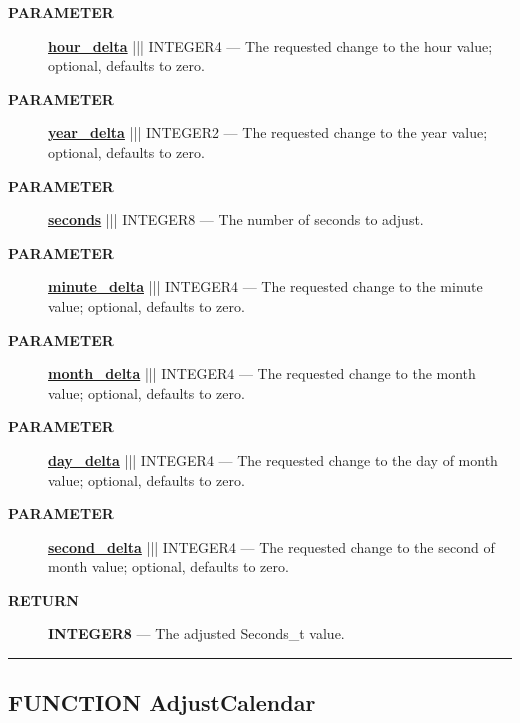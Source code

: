 \par
\begin{description}
\item [\colorbox{tagtype}{\color{white} \textbf{\textsf{PARAMETER}}}] \textbf{\underline{hour\_delta}} ||| INTEGER4 --- The requested change to the hour value; optional, defaults to zero.
\item [\colorbox{tagtype}{\color{white} \textbf{\textsf{PARAMETER}}}] \textbf{\underline{year\_delta}} ||| INTEGER2 --- The requested change to the year value; optional, defaults to zero.
\item [\colorbox{tagtype}{\color{white} \textbf{\textsf{PARAMETER}}}] \textbf{\underline{seconds}} ||| INTEGER8 --- The number of seconds to adjust.
\item [\colorbox{tagtype}{\color{white} \textbf{\textsf{PARAMETER}}}] \textbf{\underline{minute\_delta}} ||| INTEGER4 --- The requested change to the minute value; optional, defaults to zero.
\item [\colorbox{tagtype}{\color{white} \textbf{\textsf{PARAMETER}}}] \textbf{\underline{month\_delta}} ||| INTEGER4 --- The requested change to the month value; optional, defaults to zero.
\item [\colorbox{tagtype}{\color{white} \textbf{\textsf{PARAMETER}}}] \textbf{\underline{day\_delta}} ||| INTEGER4 --- The requested change to the day of month value; optional, defaults to zero.
\item [\colorbox{tagtype}{\color{white} \textbf{\textsf{PARAMETER}}}] \textbf{\underline{second\_delta}} ||| INTEGER4 --- The requested change to the second of month value; optional, defaults to zero.
\end{description}







\par
\begin{description}
\item [\colorbox{tagtype}{\color{white} \textbf{\textsf{RETURN}}}] \textbf{INTEGER8} --- The adjusted Seconds\_t value.
\end{description}




\rule{\linewidth}{0.5pt}
\subsection*{\textsf{\colorbox{headtoc}{\color{white} FUNCTION}
AdjustCalendar}}

